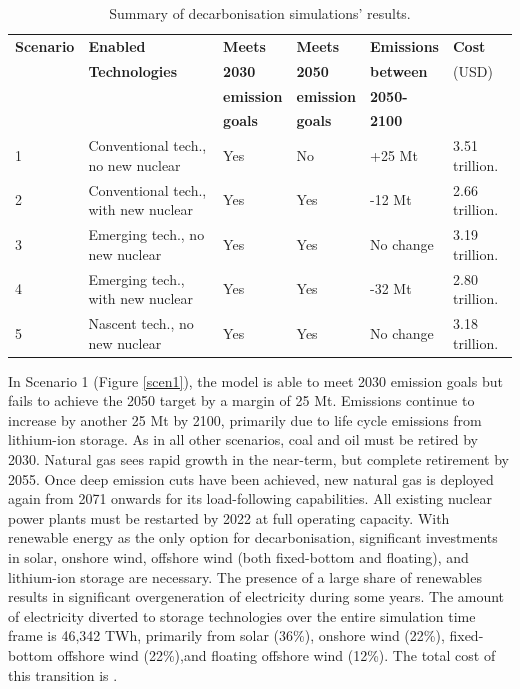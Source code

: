\begin{table}[H]
\centering
	\caption{Summary of decarbonisation simulations' results.}
	\vspace{0.1in}
	\begin{tabularx}{0.9\textwidth}{p{} p{}p{}p{}p{}p{}}
		\hline
\textbf{Scenario} & \textbf{Enabled} & \textbf{Meets} & \textbf{Meets} & \textbf{Emissions} & \textbf{Cost} \\
 & \textbf{Technologies} & \textbf{2030} & \textbf{2050} & \textbf{between} & (USD) \\
 &  & \textbf{emission} & \textbf{emission} & \textbf{2050-} &  \\
 &  & \textbf{goals} & \textbf{goals} & \textbf{2100} &  \\
\hline
1 & Conventional tech., no new nuclear & Yes & No & +25 Mt & 3.51 trillion. \\
2 & Conventional tech., with new nuclear & Yes & Yes & -12 Mt & 2.66 trillion. \\
3 & Emerging tech., no new nuclear & Yes & Yes & No change & 3.19 trillion. \\
4 & Emerging tech., with new nuclear & Yes & Yes & -32 Mt & 2.80 trillion. \\
5 & Nascent tech., no new nuclear & Yes & Yes & No change & 3.18 trillion. \\
\hline 
	\end{tabularx}
\label{tab:results_summary}
\end{table}

In Scenario 1 (Figure \ref{scen1}), the model is able to meet 2030 emission goals but fails to achieve the 2050 target by a margin of 25 Mt. Emissions continue to increase by another 25 Mt by 2100, primarily due to life cycle emissions from lithium-ion storage. As in all other scenarios, coal and oil must be retired by 2030. Natural gas sees rapid growth in the near-term, but complete retirement by 2055. Once deep emission cuts have been achieved, new natural gas is deployed again from 2071 onwards for its load-following capabilities. All existing nuclear power plants must be restarted by 2022 at full operating capacity. With renewable energy as the only option for decarbonisation, significant investments in solar, onshore wind, offshore wind (both fixed-bottom and floating), and lithium-ion storage are necessary. The presence of a large share of renewables results in significant overgeneration of electricity during some years. The amount of electricity diverted to storage technologies over the entire simulation time frame is 46,342 TWh, primarily from solar (36\%), onshore wind (22\%), fixed-bottom offshore wind (22\%),and floating offshore wind (12\%). The total cost of this transition is \DIFdelbegin \textbf{}%
\DIFdelend \DIFaddbegin {}\DIFaddend .

